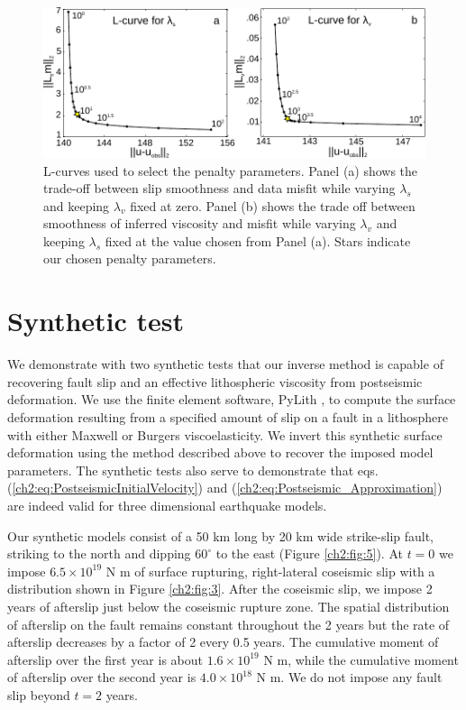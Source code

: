 \begin{figure}
\includegraphics{ch2/figures/Fig2.pdf}
\caption{L-curves used to select the penalty parameters. Panel (a)
shows the trade-off between slip smoothness and data misfit while
varying $\lambda_s$ and keeping $\lambda_v$ fixed at zero.  Panel (b)
shows the trade off between smoothness of inferred viscosity and
misfit while varying $\lambda_v$ and keeping $\lambda_s$ fixed at the
value chosen from Panel (a).  Stars indicate our chosen penalty
parameters.}
\label{ch2:fig:2}
\end{figure}

\section{Synthetic test}\label{ch2:sec:SynthTest}
We demonstrate with two synthetic tests that our inverse method is
capable of recovering fault slip and an effective lithospheric
viscosity from postseismic deformation.  We use the finite element
software, PyLith \citep{Aagaard2013}, to compute the surface deformation
resulting from a specified amount of slip on a fault in a lithosphere
with either Maxwell or Burgers viscoelasticity.  We invert this
synthetic surface deformation using the method described above to
recover the imposed model parameters.  The synthetic tests also serve
to demonstrate that eqs. (\ref{ch2:eq:PostseismicInitialVelocity}) and
(\ref{ch2:eq:Postseismic_Approximation}) are indeed valid for three
dimensional earthquake models.

Our synthetic models consist of a 50 km long by 20 km wide strike-slip
fault, striking to the north and dipping $60^{\circ}$ to the east
(Figure \ref{ch2:fig:5}). At $t=0$ we impose $6.5\times 10^{19}$ N m of surface
rupturing, right-lateral coseismic slip with a distribution shown in
Figure \ref{ch2:fig:3}. After the coseismic slip, we impose 2 years of afterslip just
below the coseismic rupture zone.  The spatial distribution of
afterslip on the fault remains constant throughout the 2 years but the
rate of afterslip decreases by a factor of 2 every 0.5 years.  The
cumulative moment of afterslip over the first year is about $1.6\times
10^{19}$ N m, while the cumulative moment of afterslip over the second
year is $4.0\times 10^{18}$ N m.  We do not impose any fault slip
beyond $t=2$ years.

